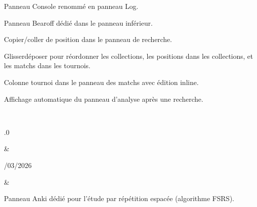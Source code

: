 \documentclass[letterpaper,10pt,french]{sphinxmanual}
\begin{document}
\begin{savenotes}
\begin{longtable}{}
\begin{varwidth}[t]{}
\sphinxAtStartPar
Panneau Console renommé en panneau Log.

\sphinxAtStartPar
Panneau Bearoff dédié dans le panneau inférieur.

\sphinxAtStartPar
Copier/coller de position dans le panneau de recherche.

\sphinxAtStartPar
Glisser\sphinxhyphen{}déposer pour réordonner les collections, les positions dans les collections, et les matchs dans les tournois.

\sphinxAtStartPar
Colonne tournoi dans le panneau des matchs avec édition inline.

\sphinxAtStartPar
Affichage automatique du panneau d’analyse après une recherche.
\sphinxbeforeendvarwidth
\end{varwidth}%
\\
\sphinxhline\begin{varwidth}[t]{}
.0
\sphinxbeforeendvarwidth
\end{varwidth}%
&\begin{varwidth}[t]{}
/03/2026
\sphinxbeforeendvarwidth
\end{varwidth}%
&\begin{varwidth}[t]{}
\sphinxAtStartPar
Panneau Anki dédié pour l’étude par répétition espacée (algorithme FSRS).


\end{varwidth}
\end{longtable}
\end{savenotes}
\end{document}
